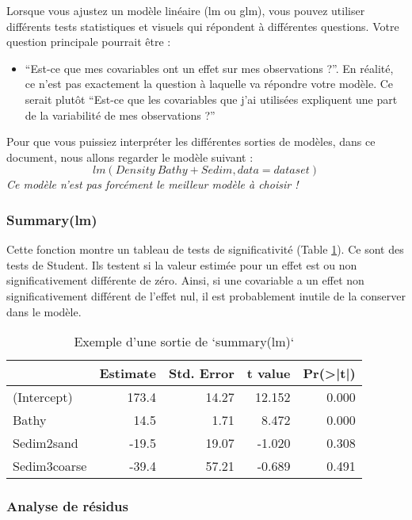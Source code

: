 \documentclass[french,a4paper]{article}
\providecommand{\tightlist}{%
  \setlength{\itemsep}{0pt}\setlength{\parskip}{0pt}}
\begin{document}
Lorsque vous ajustez un modèle linéaire (lm ou glm), vous pouvez
utiliser différents tests statistiques et visuels qui répondent à
différentes questions. Votre question principale pourrait être :

\begin{itemize}
\tightlist
\item
  ``Est-ce que mes covariables ont un effet sur mes observations ?''. En
  réalité, ce n'est pas exactement la question à laquelle va répondre
  votre modèle. Ce serait plutôt ``Est-ce que les covariables que j'ai
  utilisées expliquent une part de la variabilité de mes observations
  ?''
\end{itemize}

Pour que vous puissiez interpréter les différentes sorties de modèles,
dans ce document, nous allons regarder le modèle suivant :
\[lm(Density ~ Bathy + Sedim, data = dataset)\] \emph{Ce modèle n'est
pas forcément le meilleur modèle à choisir !}

\hypertarget{summarylm}{%
\subsubsection{Summary(lm)}\label{summarylm}}

Cette fonction montre un tableau de tests de significativité (Table
\ref{tab:RTableSummary}). Ce sont des tests de Student. Ils testent si
la valeur estimée pour un effet est ou non significativement différente
de zéro. Ainsi, si une covariable a un effet non significativement
différent de l'effet nul, il est probablement inutile de la conserver
dans le modèle.

\begin{table}

\caption{\label{tab:RTableSummary}Exemple d'une sortie de `summary(lm)`}
\centering
\begin{tabular}[t]{l|r|r|r|r}
\hline
  & Estimate & Std. Error & t value & Pr(>|t|)\\
\hline
(Intercept) & 173.4 & 14.27 & 12.152 & 0.000\\
\hline
Bathy & 14.5 & 1.71 & 8.472 & 0.000\\
\hline
Sedim2sand & -19.5 & 19.07 & -1.020 & 0.308\\
\hline
Sedim3coarse & -39.4 & 57.21 & -0.689 & 0.491\\
\hline
\end{tabular}
\end{table}

\hypertarget{analyse-de-residus}{%
\subsubsection{Analyse de résidus}\label{analyse-de-residus}}
\end{document}
